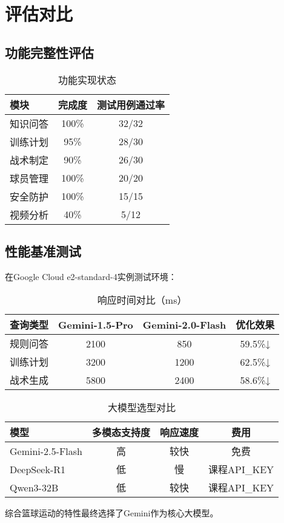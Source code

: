 \documentclass{article}
\theoremstyle{plain}
\theoremstyle{definition}
\theoremstyle{remark}
\begin{document}
\section{评估对比}

\subsection{功能完整性评估}
\begin{table}[h]
\caption{功能实现状态}
\label{feature-status}
\centering
\begin{tabular}{lcc}
\toprule
模块 & 完成度 & 测试用例通过率 \\
\midrule
知识问答 & 100\% & 32/32 \\
训练计划 & 95\% & 28/30 \\
战术制定 & 90\% & 26/30 \\
球员管理 & 100\% & 20/20 \\
安全防护 & 100\% & 15/15 \\
视频分析 & 40\% & 5/12 \\
\bottomrule
\end{tabular}
\end{table}

\subsection{性能基准测试}
在Google Cloud e2-standard-4实例测试环境：
\begin{table}[h]
\caption{响应时间对比（ms）}
\label{performance}
\centering
\begin{tabular}{lccc}
\toprule
查询类型 & Gemini-1.5-Pro & Gemini-2.0-Flash & 优化效果 \\
\midrule
规则问答 & 2100 & 850 & 59.5\%↓ \\
训练计划 & 3200 & 1200 & 62.5\%↓ \\
战术生成 & 5800 & 2400 & 58.6\%↓ \\
\bottomrule
\end{tabular}
\end{table}


\begin{table}[h]
\caption{大模型选型对比}
\label{model-selection}
\centering
\begin{tabular}{lccc}
\toprule
模型 & 多模态支持度 & 响应速度 & 费用 \\
\midrule
Gemini-2.5-Flash & 高 & 较快 & 免费 \\
DeepSeek-R1 & 低 & 慢 & 课程API_KEY \\
Qwen3-32B & 低 & 较快 & 课程API_KEY \\
\bottomrule
\end{tabular}
\end{table}
综合篮球运动的特性最终选择了Gemini作为核心大模型。
\end{document}
